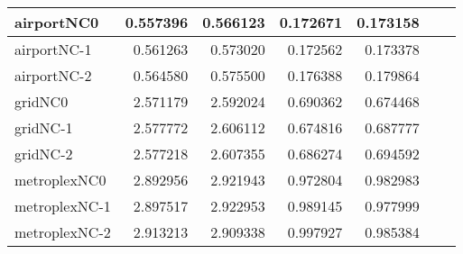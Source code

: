 \documentclass[../../../thesis.tex]{subfiles}
\begin{document}
\begin{longtable}{|l|r|r|r|r|r|r|}
airportNC0 & 0.557396 & 0.566123 & 0.172671 & 0.173158 \\ \hline
airportNC-1 & 0.561263 & 0.573020 & 0.172562 & 0.173378 \\ \hline
airportNC-2 & 0.564580 & 0.575500 & 0.176388 & 0.179864 \\ \hline
gridNC0 & 2.571179 & 2.592024 & 0.690362 & 0.674468 \\ \hline
gridNC-1 & 2.577772 & 2.606112 & 0.674816 & 0.687777 \\ \hline
gridNC-2 & 2.577218 & 2.607355 & 0.686274 & 0.694592 \\ \hline
metroplexNC0 & 2.892956 & 2.921943 & 0.972804 & 0.982983 \\ \hline
metroplexNC-1 & 2.897517 & 2.922953 & 0.989145 & 0.977999 \\ \hline
metroplexNC-2 & 2.913213 & 2.909338 & 0.997927 & 0.985384 \\ \hline
\end{longtable}
\end{document}
